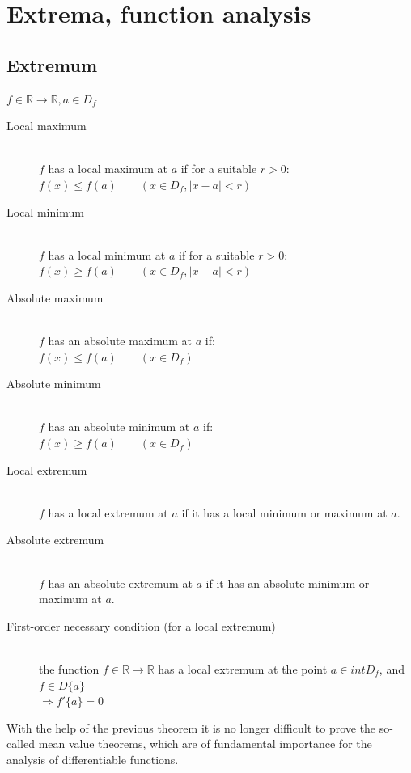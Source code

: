 \documentclass[margin=0px]{article}
\newcommand{\R}{\mathbb{R}}
\begin{document}
\section{Extrema, function analysis}
\subsection{Extremum}
$ f \in \R \rightarrow \R, a \in D_f$
\begin{description}
    \item[Local maximum] \hfill \\
        $f$ has a local maximum at $a$ if for a suitable $ r > 0$: \\
        $ f(x) \leq f(a) \qquad (x\in D_f, |x-a|<r)$
    \item[Local minimum] \hfill \\
        $f$ has a local minimum at $a$ if for a suitable $ r > 0$: \\
        $ f(x) \geq f(a) \qquad (x\in D_f, |x-a|<r)$
    \item[Absolute maximum] \hfill \\
        $f$ has an absolute maximum at $a$ if: \\
        $ f(x) \leq f(a) \qquad (x\in D_f)$
    \item[Absolute minimum] \hfill \\
        $f$ has an absolute minimum at $a$ if: \\
        $ f(x) \geq f(a) \qquad (x\in D_f)$
    \item[Local extremum] \hfill \\
        $f$ has a local extremum at $a$ if it has a local minimum or maximum at $a$.
    \item[Absolute extremum] \hfill \\
        $f$ has an absolute extremum at $a$ if it has an absolute minimum or maximum at $a$.
    \item[First-order necessary condition (for a local extremum)] \hfill \\
        the function $f \in \R \rightarrow \R$ has a local extremum at the point $ a \in intD_f $, and $ f \in D\{a\}$ \\
        $ \Rightarrow f'\{a\} = 0 $
\end{description}
With the help of the previous theorem it is no longer difficult to prove the so-called mean value theorems, which are of fundamental importance for the analysis of differentiable functions.
\end{document}
